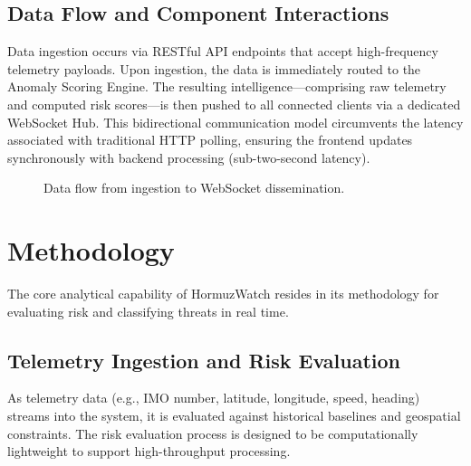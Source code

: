 \documentclass[11pt,a4paper]{article}
\begin{document}
\subsection{Data Flow and Component Interactions}
Data ingestion occurs via RESTful API endpoints that accept high-frequency telemetry payloads. Upon ingestion, the data is immediately routed to the Anomaly Scoring Engine. The resulting intelligence—comprising raw telemetry and computed risk scores—is then pushed to all connected clients via a dedicated WebSocket Hub. This bidirectional communication model circumvents the latency associated with traditional HTTP polling, ensuring the frontend updates synchronously with backend processing (sub-two-second latency).

\begin{figure}[h]
    \centering
    \caption{Data flow from ingestion to WebSocket dissemination.}
    \label{fig:dataflow}
\end{figure}

\section{Methodology}
The core analytical capability of HormuzWatch resides in its methodology for evaluating risk and classifying threats in real time.

\subsection{Telemetry Ingestion and Risk Evaluation}
As telemetry data (e.g., IMO number, latitude, longitude, speed, heading) streams into the system, it is evaluated against historical baselines and geospatial constraints. The risk evaluation process is designed to be computationally lightweight to support high-throughput processing.
\end{document}
